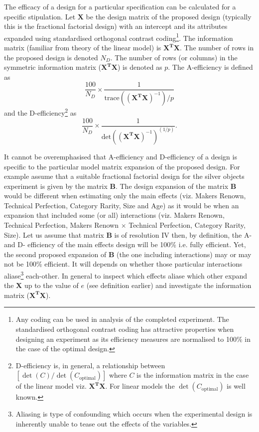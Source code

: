 \documentclass{article}
\begin{document}
The efficacy of a design for a particular specification can be calculated for a specific stipulation.
Let $\mathbf{X}$ be the design matrix of the proposed design (typically this is the fractional factorial design) with an intercept and its attributes expanded using standardised orthogonal contrast coding\footnote{Any coding can be used in analysis of the completed experiment. The standardised orthogonal contrast coding has attractive properties when designing an experiment as its efficiency measures are normalised to 100\% in the case of the optimal design.}.
The information matrix (familiar from theory of the linear model) is $\mathbf{X^{T}X}$.
The number of rows in the proposed design is denoted $N_D$.
The number of rows (or columns) in the symmetric information matrix ($\mathbf{X^{T}X}$) is denoted as $p$.
The A-efficiency is defined as
\begin{equation}
\dfrac{100}{N_D} \times \dfrac{1}{\text{trace} ((\mathbf{X^{T}X})^{-1})/p}
\end{equation}
and the D-efficiency\footnote{D-efficiency is, in general, a relationship between $[\det(C)/\det(C_{\text{optimal}})]$ where $C$ is the information matrix in the case of the linear model viz. $\mathbf{X^{T}X}$. For linear models the $\det(C_{\text{optimal}})$ is well known.} as
\begin{equation}
  \dfrac{100}{N_D} \times \dfrac{1}{ \text{det} ((\mathbf{X^{T}X})^{-1})^{(1/p)}}.
\end{equation}

It cannot be overemphasised that A-efficiency and D-efficiency of a design is specific to the particular model matrix expansion of the proposed design.
For example assume that a suitable fractional factorial design for the silver objects experiment is given by the matrix $\mathbf{B}$.
The design expansion of the matrix $\mathbf{B}$ would be different when estimating only the main effects (viz. Makers Renown, Technical Perfection, Category Rarity, Size and Age) as it would be when an expansion that included some (or all) interactions (viz. Makers Renown, Technical Perfection, Makers Renown $\times$ Technical Perfection, Category Rarity, Size).
Let us assume that matrix $\mathbf{B}$ is of resolution IV then, by definition, the A- and D- efficiency of the main effects design will be 100\% i.e. fully efficient.
Yet, the second proposed expansion of $\mathbf{B}$ (the one including interactions) may or may not be 100\% efficient.
It will depends on whether those particular interactions aliase\footnote{Aliasing is type of confounding which occurs when the experimental design is inherently unable to tease out the effects of the variables.} each-other.
In general to inspect which effects aliase which other expand the $\mathbf{X}$ up to the value of $e$ (see definition earlier) and investigate the information matrix ($\mathbf{X^{T}X}$).
\end{document}
